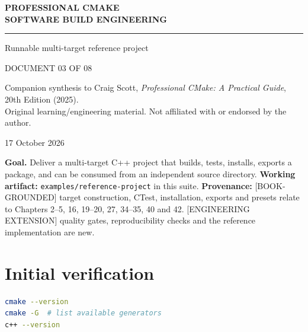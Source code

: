 \documentclass[11pt,letterpaper,oneside]{report}
\providecommand{\passthrough}[1]{#1}
\begin{document}
\hypersetup{pageanchor=false}\begin{titlepage}
\color{navy}
\vspace*{1.15in}
{\Large\bfseries PROFESSIONAL CMAKE\\[7pt]SOFTWARE BUILD ENGINEERING\par}
\vspace{0.32in}\noindent\textcolor{teal}{\rule{0.9\linewidth}{2.3pt}}\par
\vspace{0.45in}
\par
\vspace{0.3in}
{\Large\color{teal}Runnable multi-target reference project\par}
\vfill
{\large DOCUMENT 03 OF 08\par}
\vspace{0.1in}
{\small Companion synthesis to Craig Scott, \emph{Professional CMake: A Practical Guide}, 20th Edition (2025).\\
Original learning/engineering material. Not affiliated with or endorsed by the author.\par}
\vspace{0.2in}
{\small 17 October 2026\par}
\end{titlepage}
\hypersetup{pageanchor=true}\clearpage{}\tableofcontents\clearpage{}

\textbf{Goal.} Deliver a multi-target C++ project that builds, tests,
installs, exports a package, and can be consumed from an independent
source directory. \textbf{Working artifact:}
\passthrough{\lstinline!examples/reference-project!} in this suite.
\textbf{Provenance:} {[}BOOK-GROUNDED{]} target construction, CTest,
installation, exports and presets relate to Chapters 2--5, 16, 19--20,
27, 34--35, 40 and 42. {[}ENGINEERING EXTENSION{]} quality gates,
reproducibility checks and the reference implementation are new.

\chapter{Initial verification}\label{initial-verification}

\begin{lstlisting}[language=sh]
cmake --version
cmake -G  # list available generators
c++ --version
\end{lstlisting}
\end{document}
